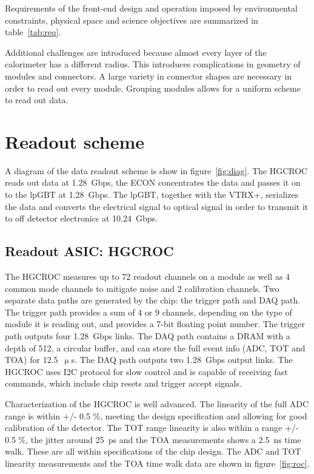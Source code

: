 \documentclass[twocolumn]{webofc}
\begin{document}
Requirements of the front-end design and operation imposed by environmental constraints, physical space and science objectives are summarized in table~\ref{tab:req}.

Additional challenges are introduced because almost every layer of the calorimeter has a different radius. This introduces complications in geometry of modules and connectors. A large variety in connector shapes are necessary in order to read out every module. Grouping modules allows for a uniform scheme to read out data.

\section{Readout scheme}
\label{sec:readout}

A diagram of the data readout scheme is show in figure~\ref{fig:diag}. The HGCROC reads out data at 1.28~Gbps, the ECON concentrates the data and passes it on to the lpGBT at 1.28~Gbps. The lpGBT, together with the VTRX+, serializes the data and converts the electrical signal to optical signal in order to transmit it to off detector electronics at 10.24~Gbps.

\subsection{Readout ASIC: HGCROC}
\label{sec:roc}
The HGCROC measures up to 72 readout channels on a module as well as 4 common mode channels to mitigate noise and 2 calibration channels.
Two separate data paths are generated by the chip: the trigger path and DAQ path.
The trigger path provides a sum of 4 or 9 channels, depending on the type of module it is reading out, and provides a 7-bit floating point number. The trigger path outputs four 1.28~Gbps links. The DAQ path contains a DRAM with a depth of 512, a circular buffer, and can store the full event info (ADC, TOT and TOA) for 12.5~$\upmu$s. The DAQ path outputs two 1.28~Gbps output links. The HGCROC uses I2C protocol for slow control and is capable of receiving fast commands, which include chip resets and trigger accept signals.

Characterization of the HGCROC is well advanced. The linearity of the full ADC range is within +/- 0.5 \%, meeting the design specification and allowing for good calibration of the detector. The TOT range linearity is also within a range +/- 0.5 \%, the jitter around 25~ps and the TOA measurements shows a 2.5~ns time walk. These are all within specifications of the chip design. The ADC and TOT linearity measurements and the TOA time walk data are shown in figure~\ref{fig:roc}.
\end{document}
